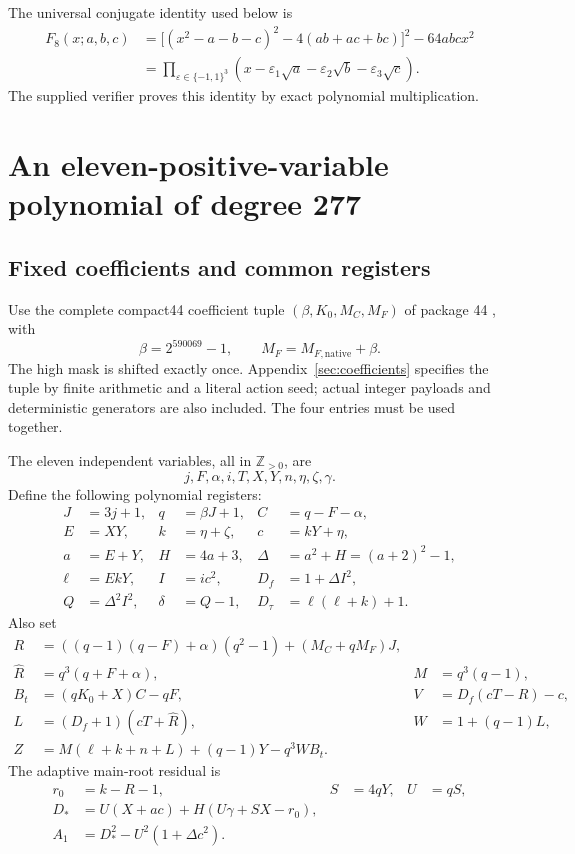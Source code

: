 \documentclass[11pt]{article}
\theoremstyle{definition}
\theoremstyle{remark}
\newcommand{\Zp}{\mathbb Z_{>0}}
\begin{document}
The universal conjugate identity used below is
\begin{align}\label{eq:octic}
 F_8(x;a,b,c)
 &=\bigl[(x^2-a-b-c)^2-4(ab+ac+bc)\bigr]^2-64abcx^2\\
 &=\prod_{\varepsilon\in\{-1,1\}^3}
   (x-\varepsilon_1\sqrt a-\varepsilon_2\sqrt b-\varepsilon_3\sqrt c).
 \nonumber
\end{align}
The supplied verifier proves this identity by exact polynomial multiplication.

\section{An eleven-positive-variable polynomial of degree 277}\label{sec:eleven}

\subsection{Fixed coefficients and common registers}

Use the complete compact44 coefficient tuple
$(\beta,K_0,M_C,M_F)$ of package 44 \cite{native44}, with
\[
 \beta=2^{590069}-1,\qquad M_F=M_{F,\mathrm{native}}+\beta.
\]
The high mask is shifted exactly once. Appendix~\ref{sec:coefficients}
specifies the tuple by finite arithmetic and a literal action seed; actual
integer payloads and deterministic generators are also included. The four
entries must be used together.

The eleven independent variables, all in $\Zp$, are
\[
 j,F,\alpha,i,T,X,Y,n,\eta,\zeta,\gamma.
\]
Define the following polynomial registers:
\begin{align*}
 J&=3j+1,& q&=\beta J+1,& C&=q-F-\alpha,\\
 E&=XY,& k&=\eta+\zeta,& c&=kY+\eta,\\
 a&=E+Y,& H&=4a+3,& \Delta&=a^2+H=(a+2)^2-1,\\
 \ell&=EkY,& I&=ic^2,& D_f&=1+\Delta I^2,\\
 Q&=\Delta^2 I^2,& \delta&=Q-1,& D_\tau&=\ell(\ell+k)+1.
\end{align*}
Also set
\begin{align*}
 R&=((q-1)(q-F)+\alpha)(q^2-1)+(M_C+qM_F)J,\\
 \widehat R&=q^3(q+F+\alpha),& M&=q^3(q-1),\\
 B_t&=(qK_0+X)C-qF,& V&=D_f(cT-R)-c,\\
 L&=(D_f+1)(cT+\widehat R),& W&=1+(q-1)L,\\
 Z&=M(\ell+k+n+L)+(q-1)Y-q^3WB_t.
\end{align*}
The adaptive main-root residual is
\begin{align*}
 r_0&=k-R-1,& S&=4qY,& U&=qS,\\
 D_*&=U(X+ac)+H(U\gamma+SX-r_0),\\
 A_1&=D_*^2-U^2(1+\Delta c^2).
\end{align*}
\end{document}
